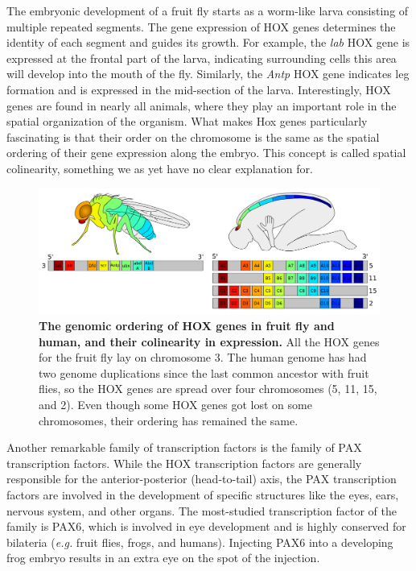 The embryonic development of a fruit fly starts as a worm-like larva consisting of multiple repeated segments. The gene expression of HOX genes determines the identity of each segment and guides its growth. For example, the \textit{lab} HOX gene is expressed at the frontal part of the larva, indicating surrounding cells this area will develop into the mouth of the fly\cite{Hughes2002}. Similarly, the \textit{Antp} HOX gene indicates leg formation and is expressed in the mid-section of the larva. Interestingly, HOX genes are found in nearly all animals, where they play an important role in the spatial organization of the organism. What makes Hox genes particularly fascinating is that their order on the chromosome is the same as the spatial ordering of their gene expression along the embryo. This concept is called spatial colinearity, something we as yet have no clear explanation for\cite{Gaunt2015}.

\begin{figure}
    \center
    \includegraphics[width=\linewidth]{ch.introduction/imgs/hox.png}
    \caption{\textbf{The genomic ordering of HOX genes in fruit fly and human, and their colinearity in expression.} All the HOX genes for the fruit fly lay on chromosome 3. The human genome has had two genome duplications since the last common ancestor with fruit flies, so the HOX genes are spread over four chromosomes (5, 11, 15, and 2). Even though some HOX genes got lost on some chromosomes, their ordering has remained the same.}
    \label{fig:hox}
\end{figure}

Another remarkable family of transcription factors is the family of PAX transcription factors. While the HOX transcription factors are generally responsible for the anterior-posterior (head-to-tail) axis, the PAX transcription factors are involved in the development of specific structures like the eyes, ears, nervous system, and other organs. The most-studied transcription factor of the family is PAX6, which is involved in eye development and is highly conserved for bilateria (\textit{e.g.} fruit flies, frogs, and humans). Injecting PAX6 into a developing frog embryo results in an extra eye on the spot of the injection\cite{Chow1999}.


